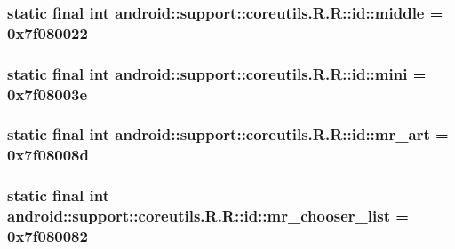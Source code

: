 \hypertarget{classandroid_1_1support_1_1coreutils_1_1_r_1_1id_22de99b57d349db59cca060b7e3e7019}{
\subsubsection[{middle}]{\setlength{\rightskip}{0pt plus 5cm}static final int android::support::coreutils.R.R::id::middle = 0x7f080022}}
\label{classandroid_1_1support_1_1coreutils_1_1_r_1_1id_22de99b57d349db59cca060b7e3e7019}


\hypertarget{classandroid_1_1support_1_1coreutils_1_1_r_1_1id_f978b6286a3f8ff701d1f0e3053f59e7}{
\subsubsection[{mini}]{\setlength{\rightskip}{0pt plus 5cm}static final int android::support::coreutils.R.R::id::mini = 0x7f08003e}}
\label{classandroid_1_1support_1_1coreutils_1_1_r_1_1id_f978b6286a3f8ff701d1f0e3053f59e7}


\hypertarget{classandroid_1_1support_1_1coreutils_1_1_r_1_1id_64be395f1b8337040a4a20583099b302}{
\subsubsection[{mr\_\-art}]{\setlength{\rightskip}{0pt plus 5cm}static final int android::support::coreutils.R.R::id::mr\_\-art = 0x7f08008d}}
\label{classandroid_1_1support_1_1coreutils_1_1_r_1_1id_64be395f1b8337040a4a20583099b302}


\hypertarget{classandroid_1_1support_1_1coreutils_1_1_r_1_1id_2643c9e61e21286347b0154eb7b06228}{
\subsubsection[{mr\_\-chooser\_\-list}]{\setlength{\rightskip}{0pt plus 5cm}static final int android::support::coreutils.R.R::id::mr\_\-chooser\_\-list = 0x7f080082}}
\label{classandroid_1_1support_1_1coreutils_1_1_r_1_1id_2643c9e61e21286347b0154eb7b06228}


